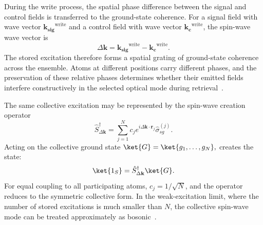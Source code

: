 During the write process, the spatial phase difference between the signal and control fields is transferred to the ground-state coherence. For a signal field with wave vector $\mathbf{k_{sig}}^{\mathrm{write}}$ and a control field with wave vector $\mathbf{k_{c}}^{\mathrm{write}}$, the spin-wave wave vector is~\cite{PsiL-odamIFm_GorshkovEtAl_2007,QmfpDp_FleischhauerEtAl_2002}
\begin{equation}
\Delta\mathbf{k}
=
\mathbf{k_{sig}}^{\mathrm{write}}
-
\mathbf{k_{c}}^{\mathrm{write}}.
\label{eq:spin_wave_wavevector}
\end{equation}
The stored excitation therefore forms a spatial grating of ground-state coherence across the ensemble. Atoms at different positions carry different phases, and the preservation of these relative phases determines whether their emitted fields interfere constructively in the selected optical mode during retrieval~\cite{PsiL-odamIFm_GorshkovEtAl_2007,QmfpDp_FleischhauerEtAl_2002}.

The same collective excitation may be represented by the spin-wave creation operator~\cite{PsiL-odamIFm_GorshkovEtAl_2007, Lqcwaealo_DuanEtAl_2001}
\begin{equation}
    \hat{S}_{\Delta\mathbf{k}}^\dagger
    =
    \sum_{j=1}^{N} c_j
    e^{i\Delta\mathbf{k}\cdot\mathbf{r}_j}
    \hat{\sigma}_{sg}^{(j)}.
    \label{eq:spin_wave_operator_discrete}
\end{equation}
Acting on the collective ground state $\ket{G}
    =
    \ket{g_1,\ldots,g_N},
    \label{eq:collective_ground_state}
$ creates the state: 
\begin{equation}
    \ket{1_S}
    =
    \hat{S}_{\Delta\mathbf{k}}^\dagger\ket{G}.
    \label{eq:spin_wave_state_operator}
\end{equation}
For equal coupling to all participating atoms, $c_j=1/\sqrt{N}$, and the operator reduces to the symmetric collective form. In the weak-excitation limit, where the number of stored excitations is much smaller than \(N\), the collective spin-wave mode can be treated approximately as bosonic~\cite{PsiL-odamIFm_GorshkovEtAl_2007}.

